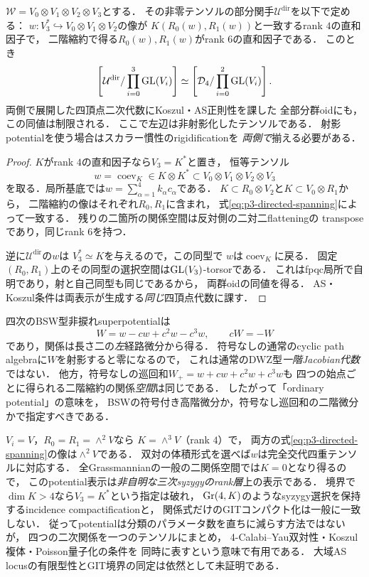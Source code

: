 \begin{proposition}
\label{prop:p3-directed-potential}
$\mathcal W=V_0\otimes V_1\otimes V_2\otimes V_3$とする．
その非零テンソルの部分関手$\mathcal U^{\mathrm{dir}}$を以下で定める：
$w:V_3^*\hookrightarrow V_0\otimes V_1\otimes V_2$の像が
$K(R_0(w),R_1(w))$と一致するrank $4$の直和因子で，
二階縮約で得る$R_0(w),R_1(w)$がrank $6$の直和因子である．
このとき
\begin{equation}\label{eq:p3-dir-pot-groupoid}
 \left[\mathcal U^{\mathrm{dir}}/
 \prod_{i=0}^{3}\mathrm{GL}(V_i)\right]
 \simeq
 \left[\mathcal D_4/\prod_{i=0}^{2}\mathrm{GL}(V_i)\right].
\end{equation}
両側で展開した四頂点二次代数にKoszul・AS正則性を課した
全部分群oidにも，この同値は制限される．
ここで左辺は非射影化したテンソルである．
射影potentialを使う場合はスカラー慣性のrigidificationを
\emph{両側で}揃える必要がある．
\end{proposition}
\begin{proof}
$K$がrank $4$の直和因子なら$V_3=K^*$と置き，
恒等テンソル
\[
 w=\operatorname{coev}_K
 \in K\otimes K^*
 \subset V_0\otimes V_1\otimes V_2\otimes V_3
\]
を取る．局所基底では$w=\sum_{\alpha=1}^4k_\alpha c_\alpha$である．
$K\subset R_0\otimes V_2$と$K\subset V_0\otimes R_1$から，
二階縮約の像はそれぞれ$R_0,R_1$に含まれ，
式\eqref{eq:p3-directed-spanning}によって一致する．
残りの二箇所の関係空間は反対側の二対二flatteningの
transposeであり，同じrank $6$を持つ．

逆に$\mathcal U^{\mathrm{dir}}$の$w$は
$V_3^*\simeq K$を与えるので，この同型で
$w$は$\operatorname{coev}_K$に戻る．
固定$(R_0,R_1)$上のその同型の選択空間は$\mathrm{GL}(V_3)$-torsorである．
これはfpqc局所で自明であり，射と自己同型も同じであるから，
両群oidの同値を得る．
AS・Koszul条件は両表示が生成する\emph{同じ}四頂点代数に課す．
\end{proof}

四次のBSW型非捩れsuperpotentialは
\[
 W=w-cw+c^2w-c^3w,\qquad cW=-W
\]
であり，関係は長さ二の\emph{左}経路微分から得る．
符号なしの通常のcyclic path algebraに$W$を射影すると零になるので，
これは通常のDWZ型\emph{一階Jacobian代数}ではない．
他方，符号なしの巡回和$W_+=w+cw+c^2w+c^3w$も
四つの始点ごとに得られる二階縮約の関係\emph{空間}は同じである．
したがって「ordinary potential」の意味を，
BSWの符号付き高階微分か，符号なし巡回和の二階微分かで指定すべきである．

\begin{remark}
$V_i=V$，$R_0=R_1=\wedge^2V$なら
$K=\wedge^3V$（rank $4$）で，
両方の式\eqref{eq:p3-directed-spanning}の像は$\wedge^2V$である．
双対の体積形式を選べば$w$は完全交代四重テンソルに対応する．
全Grassmannianの一般の二関係空間では$K=0$となり得るので，
このpotential表示は\emph{非自明な三次syzygyのrank層}上の表示である．
境界で$\dim K>4$なら$V_3=K^*$という指定は破れ，
$\operatorname{Gr}(4,K)$のようなsyzygy選択を保持するincidence compactificationと，
関係式だけのGITコンパクト化は一般に一致しない．
従ってpotentialは分類のパラメータ数を直ちに減らす方法ではないが，
四つの二次関係を一つのテンソルにまとめ，
4-Calabi--Yau双対性・Koszul複体・Poisson量子化の条件を
同時に表すという意味で有用である．
大域AS locusの有限型性とGIT境界の同定は依然として未証明である．
\end{remark}

